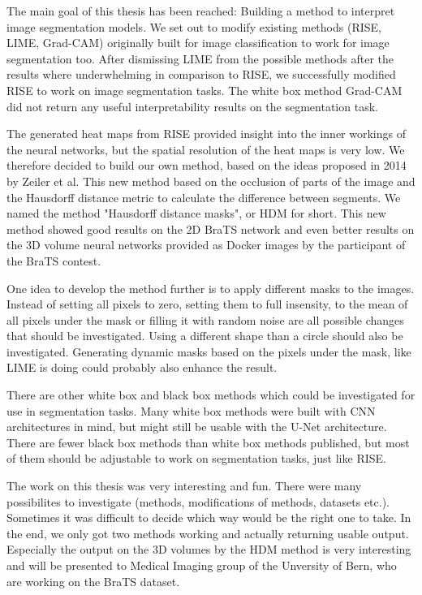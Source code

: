 The main goal of this thesis has been reached: Building a method to interpret image segmentation models. We set out to modify existing methods (RISE, LIME, Grad-CAM) originally built for image classification to work for image segmentation too. After dismissing LIME from the possible methods after the results where underwhelming in comparison to RISE, we successfully modified RISE to work on image segmentation tasks. The white box method Grad-CAM did not return any useful interpretability results on the segmentation task.

The generated heat maps from RISE provided insight into the inner workings of the neural networks, but the spatial resolution of the heat maps is very low. We therefore decided to build our own method, based on the ideas proposed in 2014 by Zeiler et al. This new method based on the occlusion of parts of the image and the Hausdorff distance metric to calculate the difference between segments. We named the method "Hausdorff distance masks", or HDM for short. This new method showed good results on the 2D BraTS network and even better results on the 3D volume neural networks provided as Docker images by the participant of the BraTS contest.

One idea to develop the method further is to apply different masks to the images. Instead of setting all pixels to zero, setting them to full insensity, to the mean of all pixels under the mask or filling it with random noise are all possible changes that should be investigated. Using a different shape than a circle should also be investigated. Generating dynamic masks based on the pixels under the mask, like LIME is doing could probably also enhance the result.

There are other white box and black box methods which could be investigated for use in segmentation tasks. Many white box methods were built with CNN architectures in mind, but might still be usable with the U-Net architecture. There are fewer black box methods than white box methods published, but most of them should be adjustable to work on segmentation tasks, just like RISE.

The work on this thesis was very interesting and fun. There were many possibilites to investigate (methods, modifications of methods, datasets etc.). Sometimes it was difficult to decide which way would be the right one to take. In the end, we only got two methods working and actually returning usable output. Especially the output on the 3D volumes by the HDM method is very interesting and will be presented to Medical Imaging group of the Unversity of Bern, who are working on the BraTS dataset.